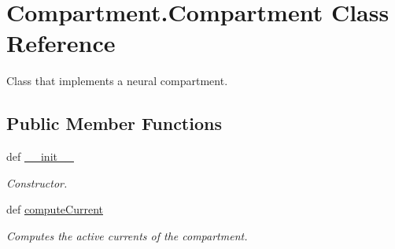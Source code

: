 \hypertarget{class_compartment_1_1_compartment}{\section{Compartment.\-Compartment Class Reference}
\label{class_compartment_1_1_compartment}
}


Class that implements a neural compartment.  


\subsection*{Public Member Functions}
\begin{DoxyCompactItemize}
\item 
def \hyperlink{class_compartment_1_1_compartment_af6abb8e8999054b0f4d99c440dc06e42}{\-\_\-\-\_\-init\-\_\-\-\_\-}
\begin{DoxyCompactList}\small\item\em Constructor. \end{DoxyCompactList}\item 
def \hyperlink{class_compartment_1_1_compartment_ab10c374833a5c36df0552d40e64e45b9}{compute\-Current}
\begin{DoxyCompactList}\small\item\em Computes the active currents of the compartment. \end{DoxyCompactList}\end{DoxyCompactItemize}
